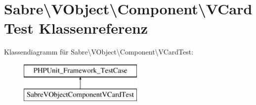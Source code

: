 \hypertarget{class_sabre_1_1_v_object_1_1_component_1_1_v_card_test}{}\section{Sabre\textbackslash{}V\+Object\textbackslash{}Component\textbackslash{}V\+Card\+Test Klassenreferenz}
\label{class_sabre_1_1_v_object_1_1_component_1_1_v_card_test}
Klassendiagramm für Sabre\textbackslash{}V\+Object\textbackslash{}Component\textbackslash{}V\+Card\+Test\+:\begin{figure}[H]
\begin{center}
\leavevmode
\includegraphics[height=2.000000cm]{class_sabre_1_1_v_object_1_1_component_1_1_v_card_test}
\end{center}
\end{figure}
